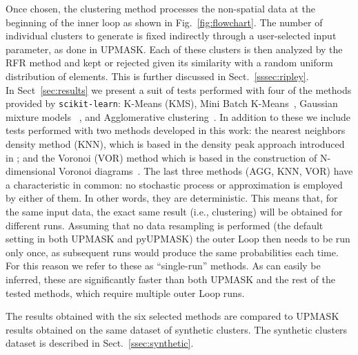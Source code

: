 \documentclass{aa}
\begin{document}
 Once chosen, the clustering method processes the non-spatial data at the
 beginning of the inner loop as shown in Fig.~\ref{fig:flowchart}. The number
 of individual clusters to generate is fixed indirectly through a
 user-selected input parameter, as done in UPMASK.
 Each of these clusters is then analyzed by the RFR method and kept or
 rejected given its similarity with a random uniform distribution of elements.
 This is further discussed in Sect.~\ref{sssec:ripley}.\\

 In Sect~\ref{sec:results} we present a suit of tests performed with
 four of the methods provided by \texttt{scikit-learn}: K-Means (KMS), Mini
 Batch K-Means~\citep[MBK,][]{Sculley2010}, Gaussian mixture models~
 \citep[GMM,][]{Baxter2010}, and Agglomerative
 clustering~\citep[AGG,][]{Zepeda2013}.
 In addition to these we include tests performed with two methods developed in
 this work: the nearest neighbors density method (KNN), which is based in the
 density peak approach introduced in \cite{Rodriguez2014}; and the 
 Voronoi (VOR) method which is based in the construction of N-dimensional
 Voronoi diagrams~\citep{Voronoi_1908}.
 The last three methods (AGG, KNN, VOR) have a characteristic in common:
 no stochastic process or approximation is employed by either of them. In
 other words, they are deterministic.
 This means that, for the same input data, the exact same result (i.e.,
 clustering) will be obtained for different runs.
 Assuming that no data resampling is performed (the default setting in both
 UPMASK and pyUPMASK) the outer Loop then needs to be run only once, as
 subsequent runs would produce the same probabilities each time. For this
 reason we refer to these as ``single-run'' methods. As can easily be
 inferred, these are significantly faster than both UPMASK and the rest of the
 tested methods, which require multiple outer Loop runs.

 The results obtained with the six selected methods are compared to UPMASK
 results obtained on the same dataset of synthetic clusters. The synthetic
 clusters dataset is described in  Sect.~\ref{ssec:synthetic}.
\end{document}
